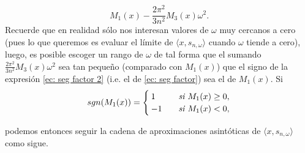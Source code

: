 \begin{equation}
\label{ec: seg factor 2}
M_{1}(x) - \frac{2\pi^{2}}{3n^{2}}M_{3}(x)\omega^{2}.
\end{equation}
Recuerde que en realidad sólo nos interesan valores de 
$\omega$ muy cercanos a cero (pues lo que queremos es evaluar
el límite de $\langle x, s_{n, \omega} \rangle$
cuando $\omega$ tiende a cero), luego, es posible escoger
un rango de $\omega$ de tal forma que el sumando 
$\frac{2\pi^{2}}{3n^{2}}M_{3}(x)\omega^{2}$ sea tan pequeño (comparado
con $M_{1}(x)$) que el signo de la expresión
\eqref{ec: seg factor 2}
(i.e. el de \eqref{ec: seg factor}) sea 
el de $M_{1}(x)$. Si
\begin{align*}
sgn(M_{1}(x))= \begin{cases}
1 & \hspace{0.2cm} \textit{ si } M_{1}(x) \geq 0, \\
-1 & \hspace{0.2cm} \textit{ si } M_{1}(x) < 0,
\end{cases}
\end{align*}

\noindent
podemos entonces seguir la cadena de
aproximaciones asintóticas de $\langle x, s_{n, \omega} \rangle$ 
como sigue.

